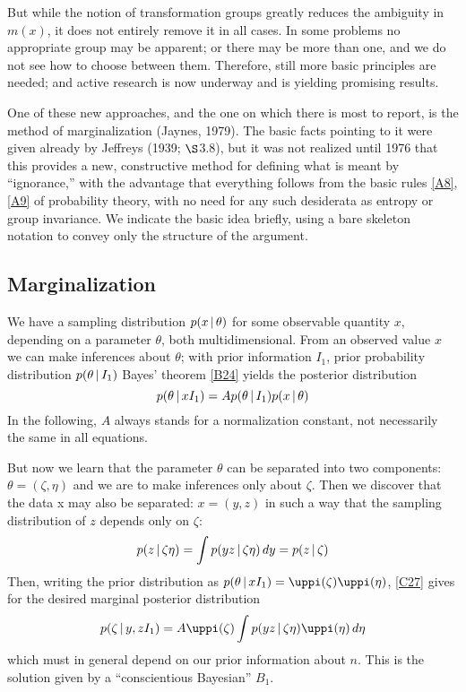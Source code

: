 {But while the notion of transformation groups greatly reduces the ambiguity in $m(x)$, it does not entirely remove it in all cases.
In some problems no appropriate group may be apparent; or there may be more than one, and we do not see how to choose between them.
Therefore, still more basic principles are needed; and active research is now underway and is yielding promising results.

One of these new approaches, and the one on which there is most to report, is the method of marginalization (Jaynes, \cite{jaynes79}{1979}).
The basic facts pointing to it were given already by Jeffreys (\cite{jeffreys}{1939}; $\S$3.8), but it was not realized until 1976 that this provides a new, constructive method for defining what is meant by ``ignorance,'' with the advantage that everything follows from the basic rules \eqref{A8}, \eqref{A9} of probability theory, with no need for any such desiderata as entropy or group invariance.
We indicate the basic idea briefly, using a bare skeleton notation to convey only the structure of the argument.

\subsection{Marginalization}
We have a sampling distribution $p(x\,\vert\, \theta)$ for some observable quantity $x$, depending on a parameter $\theta$, both multidimensional.
From an observed value $x$ we can make inferences about $\theta$; with prior information $I_1$, prior probability distribution $p(\theta \,\vert\, I_1)$ Bayes’ theorem \eqref{B24} yields the posterior distribution
\begin{equation}
	\label{C27}
	p(\theta \,\vert\, x I_1) = A p(\theta \,\vert\, I_1) p(x \,\vert\, \theta)
\end{equation}
In the following, $A$ always stands for a normalization constant, not necessarily the same in all equations.

But now we learn that the parameter $\theta$ can be separated into two components: $\theta = (\zeta, \eta)$ and we are to make inferences only about $\zeta$.
Then we discover that the data x may also be separated: $x= (y, z)$ in such a way that the sampling distribution of $z$ depends only on $\zeta$:
\begin{equation}
	\label{C28}
	p(z \,\vert\, \zeta \eta) = \int p(y z \,\vert\, \zeta \eta) \mathop{}\!d y = p(z \,\vert\, \zeta)
\end{equation}
Then, writing the prior distribution as $p(\theta \given x I_1) = \uppi(\zeta) \uppi(\eta)$, \eqref{C27} gives for the desired marginal posterior distribution
\begin{equation}
	\label{C29}
	p(\zeta \given y, z I_1) = A \uppi(\zeta) \int p(y z \given \zeta \eta) \uppi(\eta) \dd \eta
\end{equation}
which must in general depend on our prior information about $n$.
This is the solution given by a ``conscientious Bayesian'' $B_1$.

}
